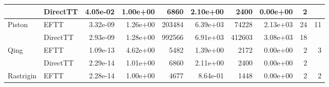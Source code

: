 \begin{table}[!ht]
{\begin{tabular}{llrrrrrrrr}
                                   & DirectTT                        & 4.05e-02                    & 1.00e+00                                           & 6860                           & 2.10e+00                                            & 2400                          & 0.00e+00                                         & 2                                        &                                          \\ \hline
    \multirow{2}{*}{Piston}        & EFTT                            & 3.32e-09                    & 1.26e+00                                           & 203484                         & 6.39e+03                                            & 74228                         & 2.13e+03                                         & 24                                       & 11                                       \\ %
                                   & DirectTT                        & 2.93e-09                    & 1.28e+00                                           & 992566                         & 6.91e+03                                            & 412603                        & 3.08e+03                                         & 18                                       &                                          \\ \hline
    \multirow{2}{*}{Qing}          & EFTT                            & 1.09e-13                    & 4.62e+00                                           & 5482                           & 1.39e+00                                            & 2172                          & 0.00e+00                                         & 2                                        & 3                                        \\ %
                                   & DirectTT                        & 2.29e-14                    & 1.01e+00                                           & 6860                           & 2.11e+00                                            & 2400                          & 0.00e+00                                         & 2                                        &                                          \\ \hline
    \multirow{2}{*}{Rastrigin}     & EFTT                            & 2.28e-14                    & 1.00e+00                                           & 4677                           & 8.64e-01                                            & 1448                          & 0.00e+00                                         & 2                                        & 2                                        \\ %

\end{tabular}}
\end{table}
